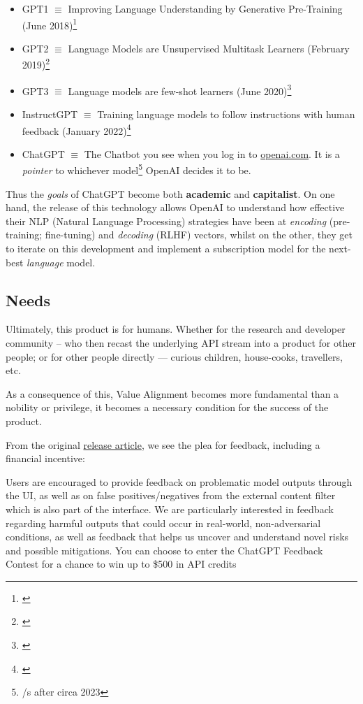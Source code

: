 \begin{itemize}
\item GPT1 $\equiv$ Improving Language Understanding by Generative Pre-Training (June 2018)\footnote{\cite{gpt1}}
\item GPT2 $\equiv$ Language Models are Unsupervised Multitask Learners (February 2019)\footnote{\cite{gpt2}}
\item GPT3 $\equiv$ Language models are few-shot learners (June 2020)\footnote{\cite{gpt3}}
\item InstructGPT $\equiv$ Training language models to follow instructions with human feedback (January 2022)\footnote{\cite{instructgpt}}
\item ChatGPT $\equiv$ The Chatbot you see when you log in to \href{https://openai.com/}{openai.com}. It is a \emph{pointer} to whichever model\footnote{/s after circa 2023} OpenAI decides it to be.
\end{itemize}

Thus the \textit{goals} of ChatGPT become both \textbf{academic} and \textbf{capitalist}. On one hand, the release of this technology allows OpenAI to understand how effective their NLP (Natural Language Processing) strategies have been at \textit{encoding} (pre-training; fine-tuning) and \textit{decoding} (RLHF) vectors, whilst on the other, they get to iterate on this development and implement a subscription model for the next-best \textit{language} model.

\subsection{Needs}

Ultimately, this product is for humans. Whether for the research and developer community -- who then recast the underlying API stream into a product for other people; or for other people directly --- curious children, house-cooks, travellers, etc.


As a consequence of this, Value Alignment \parencite{gabriel2021challenge} becomes more fundamental than a nobility or privilege, it becomes a necessary condition for the success of the product.

From the original \href{https://openai.com/index/chatgpt/}{release article}, we see the plea for feedback, including a financial incentive:

\begin{spverbatim}
Users are encouraged to provide feedback on problematic model outputs through the UI, as well as on false positives/negatives from the external content filter which is also part of the interface. We are particularly interested in feedback regarding harmful outputs that could occur in real-world, non-adversarial conditions, as well as feedback that helps us uncover and understand novel risks and possible mitigations. You can choose to enter the ChatGPT Feedback Contest for a chance to win up to \$500 in API credits
\end{spverbatim}

